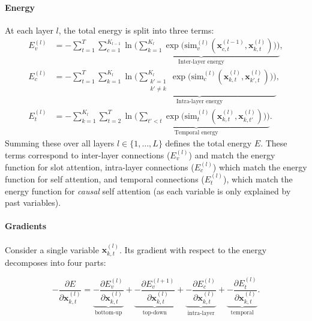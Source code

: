 \documentclass{article}
\begin{document}
\paragraph{Energy}


At each layer \(l\), the total energy is split into three terms:
\begin{equation}
    \begin{aligned}
    E_{v}^{(l)}
    &=
    -\sum_{t=1}^T
    \sum_{c=1}^{K_{l-1}}
    \underbrace{
    \ln \Biggl(
    \sum_{k=1}^{K_l}
    \exp\bigl(\mathrm{sim}_{v}^{(l)}(\bm{x}_{c,t}^{(l-1)}, \bm{x}_{k,t}^{(l)})\bigr)
    \Biggr)
    }_{\text{Inter-layer energy}},
    \\
    E_{c}^{(l)}
    &=
    -\sum_{t=1}^T
    \sum_{k=1}^{K_l}
    \underbrace{
    \ln \Biggl(
    \sum_{\substack{k'=1 \\ k'\neq k}}^{K_l}
    \exp\bigl(\mathrm{sim}_{c}^{(l)}(\bm{x}_{k,t}^{(l)}, \bm{x}_{k',t}^{(l)})\bigr)
    \Biggr)
    }_{\text{Intra-layer energy}},
    \\
    E_{t}^{(l)}
    &=
    -\sum_{k=1}^{K_l}
    \sum_{t=2}^T
    \underbrace{
    \ln \Biggl(
    \sum_{t'<t}
    \exp\bigl(\mathrm{sim}_{t}^{(l)}(\bm{x}_{k,t}^{(l)}, \bm{x}_{k,t'}^{(l)})\bigr)
    \Biggr)
    }_{\text{Temporal energy}}.
    \end{aligned}
    \end{equation}
Summing these over all layers \(l \in \{1, \dots, L\}\) defines the total energy \(E\). These terms correspond to inter-layer connections (\(E_{v}^{(l)}\)) and match the energy function for slot attention, intra-layer connections (\(E_{c}^{(l)}\)) which match the energy function for self attention, and temporal connections (\(E_{t}^{(l)}\)), which match the energy function for \emph{causal} self attention (as each variable is only explained by past variables).

\paragraph{Gradients}
Consider a single variable \(\bm{x}_{k,t}^{(l)}\). Its gradient with respect to the energy decomposes into four parts:

\begin{equation}
-\frac{\partial E}{\partial \bm{x}_{k,t}^{(l)}} = 
\underbrace{-\frac{\partial E_{v}^{(l)}}{\partial \bm{x}_{k,t}^{(l)}}}_{\text{bottom-up}} 
+ 
\underbrace{-\frac{\partial E_{v}^{(l+1)}}{\partial \bm{x}_{k,t}^{(l)}}}_{\text{top-down}} 
+ 
\underbrace{-\frac{\partial E_{c}^{(l)}}{\partial \bm{x}_{k,t}^{(l)}}}_{\text{intra-layer}} 
+ 
\underbrace{-\frac{\partial E_{t}^{(l)}}{\partial \bm{x}_{k,t}^{(l)}}}_{\text{temporal}}.
\end{equation}
\end{document}
